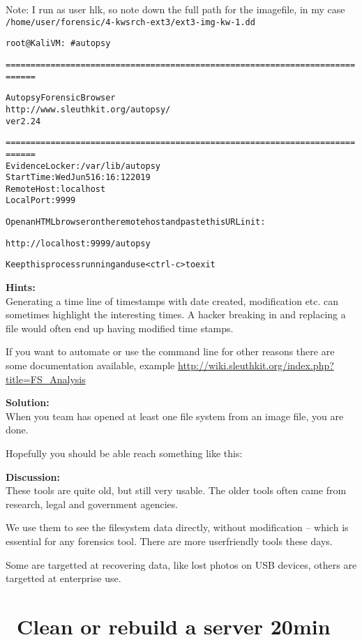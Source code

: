 \documentclass[a4paper,11pt,notitlepage]{report}
\begin{document}
Note: I run as user hlk, so note down the full path for the imagefile, in my case \verb+/home/user/forensic/4-kwsrch-ext3/ext3-img-kw-1.dd+


\begin{alltt}
root@KaliVM:~# autopsy

============================================================================

                       Autopsy Forensic Browser
                  http://www.sleuthkit.org/autopsy/
                             ver 2.24

============================================================================
Evidence Locker: /var/lib/autopsy
Start Time: Wed Jun  5 16:16:12 2019
Remote Host: localhost
Local Port: 9999

Open an HTML browser on the remote host and paste this URL in it:

    http://localhost:9999/autopsy

Keep this process running and use <ctrl-c> to exit
\end{alltt}


{\bf Hints:}\\
Generating a time line of timestamps with date created, modification etc. can sometimes highlight the interesting times. A hacker breaking in and replacing a file would often end up having modified time stamps.

If you want to automate or use the command line for other reasons there are some documentation available, example \url{http://wiki.sleuthkit.org/index.php?title=FS_Analysis}

{\bf Solution:}\\
When you team has opened at least one file system from an image file, you are done.

Hopefully you should be able reach something like this:

{\bf Discussion:}\\
These tools are quite old, but still very usable. The older tools often came from research, legal and government agencies.

We use them to see the filesystem data directly, without modification -- which is essential for any forensics tool. There are more userfriendly tools these days.

Some are targetted at recovering data, like lost photos on USB devices, others are targetted at enterprise use.


\chapter{\faInfoCircle\ Clean or rebuild a server 20min}
\label{ex:clean-or-rebuild}
\end{document}
